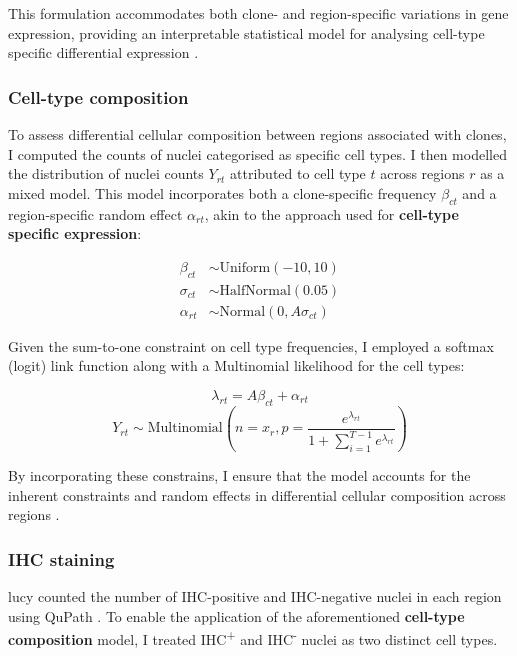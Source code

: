 This formulation accommodates both clone- and region-specific variations in gene expression, providing an interpretable statistical model for analysing cell-type specific differential expression .

\subsubsection*{Cell-type composition}

To assess differential cellular composition between regions associated with clones, I computed the counts of nuclei categorised as specific cell types. I then modelled the distribution of nuclei counts $Y_{rt}$ attributed to cell type $t$ across regions $r$ as a mixed model. This model incorporates both a clone-specific frequency $\beta_{ct}$ and a region-specific random effect $\alpha_{rt}$, akin to the approach used for \textbf{cell-type specific expression}:

\begin{align}
\beta_{ct} &\sim \text{Uniform}(-10, 10) \\
\sigma_{ct} &\sim \text{HalfNormal}(0.05) \\
\alpha_{rt} &\sim \text{Normal}(0, A\sigma_{ct})
\end{align}

Given the sum-to-one constraint on cell type frequencies, I employed a softmax (logit) link function along with a Multinomial likelihood for the cell types:

\begin{equation}
\lambda_{rt} = A\beta_{ct} + \alpha_{rt}
\end{equation}
\begin{equation}
Y_{rt} \sim \text{Multinomial}\left(n=x_r, p=\frac{e^{\lambda_{rt}}}{1 + \sum_{i=1}^{T-1} e^{\lambda_{rt}}}\right)
\end{equation}

By incorporating these constrains, I ensure that the model accounts for the inherent constraints and random effects in differential cellular composition across regions .

\subsubsection*{IHC staining}
\ac{lucy} counted the number of IHC-positive and IHC-negative nuclei in each region using QuPath \parencite{Bankhead2017-px}. To enable the application of the aforementioned \textbf{cell-type composition} model, I treated IHC\textsuperscript{+} and IHC\textsuperscript{-} nuclei as two distinct cell types.

